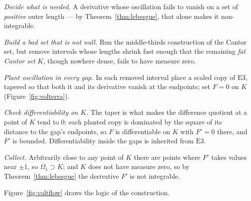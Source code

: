 \begin{flow}
  \item \textit{Decide what is needed.} A derivative whose oscillation fails
        to vanish on a set of \emph{positive} outer length --- by
        Theorem~\ref{thm:lebesgue}, that alone makes it non-integrable.
  \item \textit{Build a bad set that is not null.} Run the middle-thirds
        construction of the Cantor set, but remove intervals whose lengths
        shrink fast enough that the remaining \emph{fat Cantor set} $K$,
        though nowhere dense, fails to have measure zero.
  \item \textit{Plant oscillation in every gap.} In each removed interval
        place a scaled copy of $\mathrm{E}3$, tapered so that both it and
        its derivative vanish at the endpoints; set $F=0$ on $K$
        (Figure~\ref{fig:volterra}).
  \item \textit{Check differentiability on $K$.} The taper is what makes the
        difference quotient at a point of $K$ tend to $0$: each planted copy
        is dominated by the square of its distance to the gap's endpoints,
        so $F$ is differentiable on $K$ with $F'=0$ there, and $F'$ is
        bounded. Differentiability inside the gaps is inherited from
        $\mathrm{E}3$.
  \item \textit{Collect.} Arbitrarily close to any point of $K$ there are
        points where $F'$ takes values near $\pm1$, so
        $\Omega_1 \supset K$; and $K$ does not have measure zero, so by
        Theorem~\ref{thm:lebesgue} the derivative $F'$ is not integrable.
\end{flow}

Figure~\ref{fig:voltflow} draws the logic of the construction.

